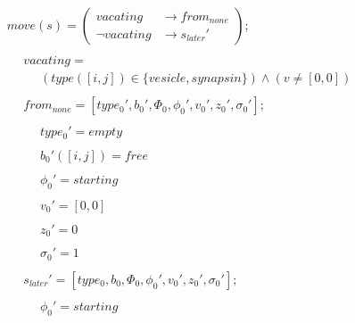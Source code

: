 \documentclass{acm_proc_article-sp}
\begin{document}
\begin{displaymath} \begin{array}{l}
move(s) = \left( \begin{array}{ll} vacating      & \rightarrow from_{none} \\
                                   \neg vacating & \rightarrow s_{later}' \end{array} \right); \\
\\
\hspace{16pt} vacating = \\
\hspace{16pt} \hspace{16pt} (type([i, j]) \in \{ vesicle, synapsin\}) \wedge (v \ne [0, 0]) \\
\\
\hspace{16pt} from_{none} = [type_0', b_0', \Phi_0, \phi_0', v_0', z_0', \sigma_0']; \\
\\
\hspace{16pt} \hspace{16pt} type_0' = empty \\
\\
\hspace{16pt} \hspace{16pt} b_0'([i, j]) = free \\
\\
\hspace{16pt} \hspace{16pt} \phi_0' = starting \\
\\
\hspace{16pt} \hspace{16pt} v_0' = [0, 0] \\
\\
\hspace{16pt} \hspace{16pt} z_0' = 0 \\
\\
\hspace{16pt} \hspace{16pt} \sigma_0' = 1 \\
\\
\hspace{16pt} s_{later}' = [type_0, b_0, \Phi_0, \phi_0', v_0', z_0', \sigma_0']; \\
\\
\hspace{16pt} \hspace{16pt} \phi_0' = starting \\

\end{array}
\end{displaymath}
\end{document}
